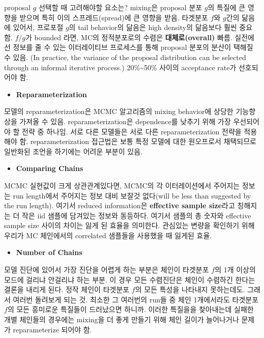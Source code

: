 \documentclass[
]{book}
\providecommand{\tightlist}{%
  \setlength{\itemsep}{0pt}\setlength{\parskip}{0pt}}
\begin{document}
proposal \(g\) 선택할 때 고려해야할 요소는? mixing은 proposal 분포 \(g\)의 특질에 큰 영향을 받으며 특히 이의 스프레드(spread)에 큰 영향을 받음. 타겟분포 \(f\)와 \(g\)간의 닮음에 있어서, 프로포절 \(g\)의 tail behavior의 닮음은 high density의 닮음보다 훨씬 중요함. \(f/g\)가 bounded 라면, MC의 정적분포로의 수렴은 \textbf{대체로(overall)} 빠름. 실전에선 정보를 줄 수 있는 이터레이티브 프로세스를 통해 proposal 분포의 분산이 택해질 수 있음. (In practice, the variance of the proposal distribution can be selected through an informal iterative process.) 20\%\textasciitilde50\% 사이의 acceptance rate가 선호되어야 함.

\begin{itemize}
\tightlist
\item
  \textbf{Reparameterization}
\end{itemize}

모델의 reparameterization은 MCMC 알고리즘의 mixing behavior에 상당한 기능향상을 가져올 수 있음. reparameterization은 dependence를 낮추기 위해 가장 우선되어야 할 전략 중 하나임. 서로 다른 모델들은 서로 다른 reparameterization 전략을 적용해야 함. reparameterization 접근법은 보통 특정 모델에 대한 원오프로서 채택되므로 일반화된 조언을 하기에는 어려운 부분이 있음.

\begin{itemize}
\tightlist
\item
  \textbf{Comparing Chains}
\end{itemize}

MCMC 실현값이 크게 상관관계있다면, MCMC의 각 이터레이션에서 주어지는 정보는 run length에서 주어지는 정보 대비 보잘것 없다(will be less than suggested by the run length). 여기서 reduced information은 \textbf{effective sample size}라고 칭해지는 더 작은 iid 샘플에 담겨있는 정보와 동등하다. 여기서 샘플의 총 숫자와 effective sample size 사이의 차이는 잃게 된 효율을 의미한다. 관심있는 변량을 확인하기 위해 우리가 MC 체인에서의 correlated 샘플들을 사용했을 때 잃게된 효율.

\begin{itemize}
\tightlist
\item
  \textbf{Number of Chains}
\end{itemize}

모델 진단에 있어서 가장 진단을 어렵게 하는 부분은 체인이 타겟분포 \(f\)의 1개 이상의 모드에 걸리냐 안걸리냐 하는 부분. 이 경우 모든 수렴진단은 체인이 수렴하긴 한다는 결론을 내리게 된다. 정작 체인이 타겟분포 \(f\)의 모든 특성을 나타내지 못하는데도. 그래서 여러번 돌려보게 되는 것. 최소한 그 여러번의 run들 중 체인 1개에서라도 타겟분포 \(f\)의 모든 흥미로운 특질들이 드러났으면 하니까. 이러한 특질을을 찾아내는데 실패한 개별 체인들의 경우에는 mixing을 더 좋게 만들기 위해 체인 길이가 늘어나거나 문제가 reparameterize 되어야 함.
\end{document}

